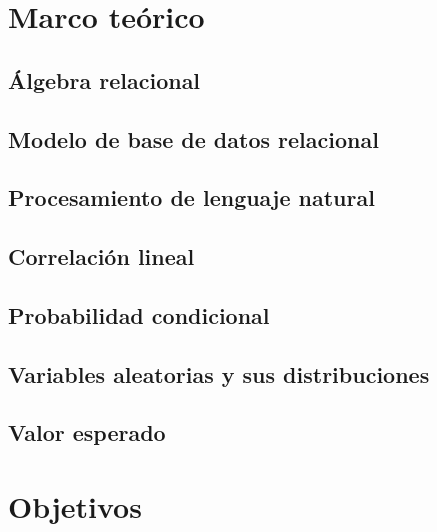 \documentclass[12pt,letterpaper]{article}
\begin{document}
  
%
\tableofcontents
\pagebreak
\section {Marco teórico}\label{sec:marcot}
\subsection {Álgebra relacional}\label{subsec:algebra}
\subsection {Modelo de base de datos relacional}\label{subsch:rdb}
\subsection {Procesamiento de lenguaje natural}\label{subsec:nlp}
\subsection {Correlación lineal}\label{subsec:corrl}
\subsection {Probabilidad condicional}\label{subsec:pcond}
\subsection {Variables aleatorias y sus distribuciones}\label{subsec:vayd}
\subsection {Valor esperado}\label{subsec:valesp}
\section {Objetivos}\label{sec:objetivos}
\end{document}
